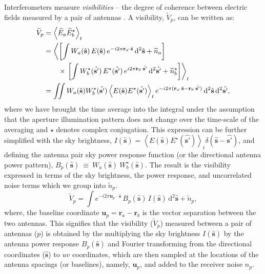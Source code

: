 \documentclass[a4paper,fleqn,usenatbib]{mnras}
\newcommand{\dif}{\mathrm{d}}
\begin{document}
Interferometers measure {\it visibilities} -- the degree of coherence between
electric fields measured by a pair of antennas \citep{van34,zer38,tho01}.
A visibility, $\widetilde{V}_p$, can be written as:
\begin{align}
  \widetilde{V}_p &= \left\langle \widetilde{E}_a\widetilde{E}_b^\star \right\rangle_t \label{eqn:cc-vis}\hfill\\
  		&= \left\langle \left[ \int {W}_a(\hat{\mathbf{s}})\,E(\hat{\mathbf{s}})\,e^{-i2\pi\mathbf{r}_a\!\cdot\,\hat{\mathbf{s}}}\,\dif^2\hat{\mathbf{s}} + \widetilde{n}_a \right] \right. \nonumber\\
		&\qquad \times \left.\left[ \int {W}^\star_b(\hat{\mathbf{s'}})\,E^\star (\hat{\mathbf{s'}})\,e^{i2\pi\mathbf{r}_b\!\cdot\,\hat{\mathbf{s'}}}\,\dif^2\hat{\mathbf{s'}} + \widetilde{n}^\star_b \right] \right\rangle_t \\
                  &= \iint {W}_a(\hat{\mathbf{s}}) {W}^\star_b(\hat{\mathbf{s'}}) \left\langle E(\hat{\mathbf{s}}) E^\star(\hat{\mathbf{s'}}) \right\rangle_t e^{-i2\pi(\mathbf{r}_a\!\cdot\,\hat{\mathbf{s}}-\mathbf{r}_b\!\cdot\,\hat{\mathbf{s'}})}\,\dif^2\hat{\mathbf{s}}\,\dif^2\hat{\mathbf{s'}},
\end{align}
where we have brought the time average into the integral under the assumption that 
the aperture illumination pattern does not change over the time-scale of the 
averaging and $\star$ denotes complex conjugation. This expression can be further 
simplified with the sky brightness, 
$I(\hat{\mathbf{s}})= \left\langle E(\hat{\mathbf{s}}) E^\star(\hat{\mathbf{s'}}) 
\right\rangle_t  \delta(\hat{\mathbf{s}}-\hat{\mathbf{s'}})$, and defining the 
antenna pair sky power response function (or the directional antenna power pattern), 
$B_p(\hat{\mathbf{s}})~\equiv~{W}_a(\hat{\mathbf{s}})~{W}^\star_b(\hat{\mathbf{s}})$. 
The result is the visibility expressed in terms of the sky brightness, the power 
response, and uncorrelated noise terms which we group into $\widetilde{n}_p$.
\begin{equation}
\widetilde{V}_p = \int e^{-i2\pi\mathbf{u}_p\!\cdot\,\hat{\mathbf{s}}}\,B_p(\hat{\mathbf{s}})\,I(\hat{\mathbf{s}})\,\dif^2\hat{\mathbf{s}} + \widetilde{n}_p,
\end{equation}
where, the baseline coordinate $\mathbf{u}_p=\mathbf{r}_a-\mathbf{r}_b$ is the 
vector separation between the two antennas. This signifies that the visibility 
($\widetilde{V}_p$) measured between a
pair of antennas ($p$) is obtained by the multiplying the sky brightness
$I(\hat{\mathbf{s}})$ by the antenna power response $B_p(\hat{\mathbf{s}})$ and
Fourier transforming from the directional coordinates ($\hat{\mathbf{s}}$) to $uv$
coordinates, which are then sampled at the locations of the antenna spacings (or
baselines), namely, $\mathbf{u}_p$, and added to the receiver noise $n_p$. 
\end{document}
